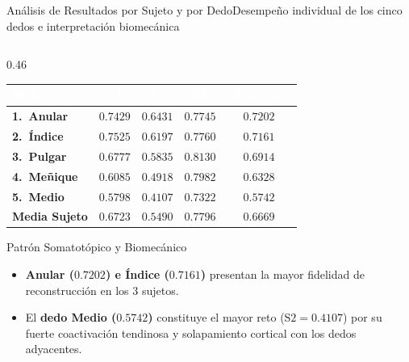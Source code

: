 \begin{frame}{An\'alisis de Resultados por Sujeto y por Dedo}{Desempe\~no individual de los cinco dedos e interpretaci\'on biomec\'anica \cite{rodas_valencia_tpe_ecog}}
  \begin{columns}[c,onlytextwidth]
    \begin{column}{0.46\textwidth}
      \scriptsize
      \centering
      \renewcommand{\arraystretch}{1.22}
      \setlength{\tabcolsep}{3.2pt}
      \begin{tabular}{@{} l c c c c @{}}
        \toprule
        \rowcolor{ipnDark}
        \textcolor{white}{\textbf{Dedo}} &
        \textcolor{white}{\textbf{S1}} &
        \textcolor{white}{\textbf{S2}} &
        \textcolor{white}{\textbf{S3}} &
        \textcolor{white}{\textbf{Media Test}} \\
        \midrule
        \rowcolor{rowHighlight}
        \textbf{1.\ Anular} & $0.7429$ & $0.6431$ & $0.7745$ & $\mathbf{0.7202}$ \\
        \rowcolor{rowLight}
        \textbf{2.\ \'Indice} & $0.7525$ & $0.6197$ & $0.7760$ & $\mathbf{0.7161}$ \\
        \textbf{3.\ Pulgar} & $0.6777$ & $0.5835$ & $0.8130$ & $\mathbf{0.6914}$ \\
        \rowcolor{rowLight}
        \textbf{4.\ Me\~nique} & $0.6085$ & $0.4918$ & $0.7982$ & $\mathbf{0.6328}$ \\
        \textbf{5.\ Medio} & $0.5798$ & $0.4107$ & $0.7322$ & $\mathbf{0.5742}$ \\
        \midrule
        \textbf{Media Sujeto} & $\mathbf{0.6723}$ & $\mathbf{0.5490}$ & $\mathbf{0.7796}$ & $\mathbf{0.6669}$ \\
        \bottomrule
      \end{tabular}

      \vspace{1.5mm}
      \begin{block}{Patr\'on Somatot\'opico y Biomec\'anico}
        \scriptsize
        \begin{itemize}\setlength{\itemsep}{2pt}
          \item \textbf{Anular ($0.7202$) e \'Indice ($0.7161$)} presentan la mayor fidelidad de reconstrucci\'on en los 3 sujetos.
          \item El \textbf{dedo Medio ($0.5742$)} constituye el mayor reto ($\text{S2}=0.4107$) por su fuerte coactivaci\'on tendinosa y solapamiento cortical con los dedos adyacentes.
        \end{itemize}
      \end{block}
    \end{column}


\end{columns}
\end{frame}
